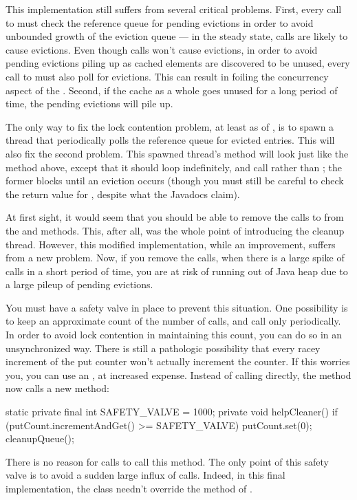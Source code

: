 This implementation still suffers from several critical problems. First, every
call to  must check the reference queue for pending evictions in order
to avoid unbounded growth of the eviction queue --- in the steady state,
 calls are likely to cause evictions. Even though  calls
won't cause evictions, in order to avoid pending evictions piling up as cached
elements are discovered to be unused, every call to  must also poll for
evictions. This can result in foiling the concurrency aspect of the
. Second, if the cache as a whole goes unused for a long
period of time, the pending evictions will pile up.

The only way to fix the lock contention problem, at least as of \javasix, is to
spawn a thread that periodically polls the reference queue for evicted entries.
This will also fix the second problem. This spawned thread's  method
will look just like the  method above, except that it should
loop indefinitely, and call  rather than ;
the former blocks until an eviction occurs (though you must still be careful to
check the return value for , despite what the Javadocs claim).

At first sight, it would seem that you should be able to remove the calls to
 from the  and  methods. This, after all,
was the whole point of introducing the cleanup thread. However, this modified
implementation, while an improvement, suffers from a new problem. Now, if you
remove the  calls, when there is a large spike of 
calls in a short period of time, you are at risk of running out of Java heap due
to a large pileup of pending evictions.

You must have a safety valve in place to prevent this situation. One possibility
is to keep an approximate count of the number of  calls, and call
 only periodically. In order to avoid lock contention in
maintaining this count, you can do so in an unsynchronized way. There is still a
pathologic possibility that every racey increment of the put counter won't
actually increment the counter. If this worries you, you can use an
, at increased expense. Instead of calling
 directly, the  method now calls a new
 method:
\begin{shortlisting}
   static private final int SAFETY_VALVE = 1000;
   private void helpCleaner() {
      if (putCount.incrementAndGet() >= SAFETY_VALVE) {
         putCount.set(0);
         cleanupQueue();
      }
   }
\end{shortlisting}
There is no reason for  calls to call this method. The only point of
this safety valve is to avoid a sudden large influx of  calls. Indeed,
in this final implementation, the  class needn't override
the  method of .

